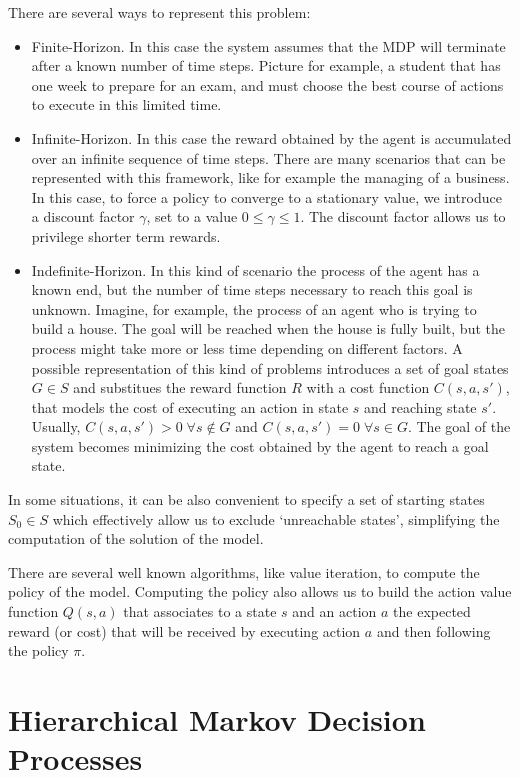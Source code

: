 There are several ways to represent this problem:
\begin{itemize}
\item Finite-Horizon. In this case the system assumes that the MDP will terminate after a known number of time steps. Picture for example, a student that has one week to prepare for an exam, and must choose the best course of actions to execute in this limited time.
\item Infinite-Horizon. In this case the reward obtained by the agent is accumulated over an infinite sequence of time steps. There are many scenarios that can be represented with this framework, like for example the managing of a business. In this case, to force a policy to converge to a stationary value, we introduce a discount factor $\gamma$, set to a value $0 \leq \gamma \leq 1$. The discount factor allows us to privilege shorter term rewards.
\item Indefinite-Horizon. In this kind of scenario the process of the agent has a known end, but the number of time steps necessary to reach this goal is unknown. Imagine, for example, the process of an agent who is trying to build a house. The goal will be reached when the house is fully built, but the process might take more or less time depending on different factors.  A possible representation of this kind of problems introduces a set of goal states $G \in S$ and substitues the reward function $R$ with a cost function $C(s,a,s')$, that models the cost of executing an action in state $s$ and reaching state $s'$. Usually, $C(s,a,s')>0\; \forall s \not \in G$ and $C(s,a,s')=0\; \forall s \in G$. The goal of the system becomes minimizing the cost obtained by the agent to reach a goal state.
\end{itemize}

In some situations, it can be also convenient to specify a set of starting states $S_0 \in S$ which effectively allow us to exclude `unreachable states', simplifying the computation of the solution of the model.

There are several well known algorithms, like value iteration, to compute the policy of the model. Computing the policy also allows us to build the action value function \(Q(s,a)\) that associates to a state $s$ and an action $a$ the expected reward (or cost) that will be received by executing action $a$ and then following the policy $\pi$. 

\section{Hierarchical Markov Decision Processes}
\label{sec:methods-hmdp}

